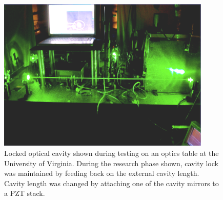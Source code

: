 \begin{figure}
\begin{center}
  \includegraphics[width=4in]{./Pictures/lockedcavity.PNG}
\caption{Locked optical cavity shown during testing on an optics table at the University of Virginia. During the research phase shown, cavity lock was maintained by feeding back on the external cavity length. Cavity length was changed by attaching one of the cavity mirrors to a PZT stack. }
\label{fig:lockedcavity}
\end{center}
\end{figure}

